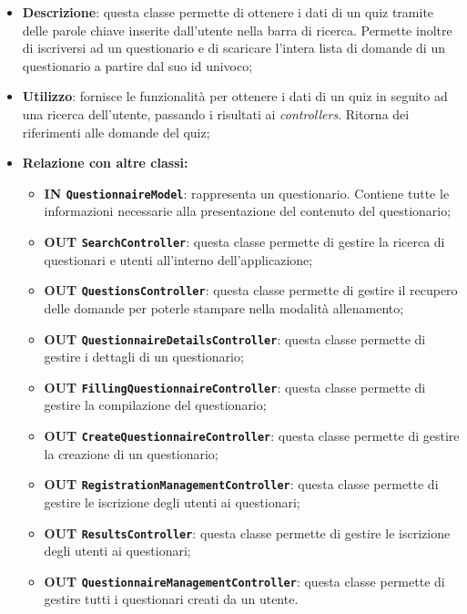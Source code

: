 \begin{itemize}
	\item \textbf{Descrizione}: questa classe permette di ottenere i dati di un quiz tramite delle parole chiave inserite dall'utente nella barra di ricerca. Permette inoltre di iscriversi ad un questionario e di scaricare l'intera lista di domande di un questionario a partire dal suo id univoco;
	\item \textbf{Utilizzo}: fornisce le funzionalità per ottenere i dati di un quiz in seguito ad una ricerca dell'utente, passando i risultati ai \textit{controllers}. Ritorna dei riferimenti alle domande del quiz;
	\item \textbf{Relazione con altre classi:}
	\begin{itemize}
		\item \textbf{IN \texttt{QuestionnaireModel}}: rappresenta un questionario. Contiene tutte le informazioni necessarie alla
		presentazione del contenuto del questionario; 
		\item \textbf{OUT \texttt{SearchController}}: questa classe permette di gestire la ricerca di questionari e utenti all'interno dell'applicazione;
		\item \textbf{OUT \texttt{QuestionsController}}: questa classe permette di gestire il recupero delle domande per poterle stampare nella modalità allenamento;
		\item \textbf{OUT \texttt{QuestionnaireDetailsController}}: questa classe permette di gestire i dettagli di un questionario;
		\item \textbf{OUT \texttt{FillingQuestionnaireController}}: questa classe permette di gestire la compilazione del questionario;
		\item \textbf{OUT \texttt{CreateQuestionnaireController}}: questa classe permette di gestire la creazione di un questionario;
		\item \textbf{OUT \texttt{RegistrationManagementController}}: questa classe permette di gestire le iscrizione degli utenti ai questionari;
		\item \textbf{OUT \texttt{ResultsController}}: questa classe permette di gestire le iscrizione degli utenti ai questionari; 
		\item \textbf{OUT \texttt{QuestionnaireManagementController}}: questa classe permette di gestire tutti i questionari creati da un utente. 
		

\end{itemize}
\end{itemize}
